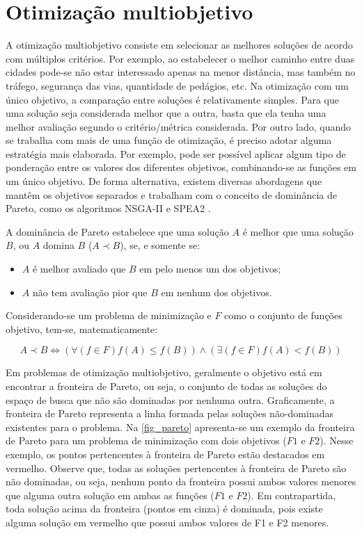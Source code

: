 \chapter[Otimização multiobjetivo]{Otimização multiobjetivo}

A otimização multiobjetivo consiste em selecionar as melhores soluções de acordo com múltiplos critérios. Por exemplo, ao estabelecer o melhor caminho entre duas cidades pode-se não estar interessado apenas na menor distância, mas também no tráfego, segurança das vias, quantidade de pedágios, etc. Na otimização com um único objetivo, a comparação entre soluções é relativamente simples. Para que uma solução seja considerada melhor que a outra, basta que ela tenha uma melhor avaliação segundo o critério/métrica considerada. Por outro lado, quando se trabalha com mais de uma função de otimização, é preciso adotar alguma estratégia mais elaborada. Por exemplo, pode ser possível aplicar algum tipo de ponderação entre os valores dos diferentes objetivos, combinando-se as funções em um único objetivo. De forma alternativa, existem diversas abordagens que mantêm os objetivos separados e trabalham com o conceito de dominância de Pareto, como os algoritmos NSGA-II \cite{Deb2002} e SPEA2 \cite{Zitzler2002}.

A dominância de Pareto estabelece que uma solução $A$ é melhor que uma solução $B$, ou $A$ domina $B$ ($A \prec B$), se, e somente se:

\begin{itemize}  
	\item $A$ é melhor avaliado que $B$ em pelo menos um dos objetivos;
	\item $A$ não tem avaliação pior que $B$ em nenhum dos objetivos.
\end{itemize}

Considerando-se um problema de minimização e $F$ como o conjunto de funções objetivo, tem-se, matematicamente:

\begin{equation}A \prec B \Leftrightarrow (\forall(f \in F) f(A) \leq f(B)) \land (\exists (f \in F) f(A) < f(B))\end{equation}

Em problemas de otimização multiobjetivo, geralmente o objetivo está em encontrar a fronteira de Pareto, ou seja, o conjunto de todas as soluções do espaço de busca que não são dominadas por nenhuma outra. Graficamente, a fronteira de Pareto representa a linha formada pelas soluções não-dominadas existentes para o problema. Na \autoref{fig_pareto} apresenta-se um exemplo da fronteira de Pareto para um problema de minimização com dois objetivos ($F1$ e $F2$). Nesse exemplo, os pontos pertencentes à fronteira de Pareto estão destacados em vermelho. Observe que, todas as soluções pertencentes à fronteira de Pareto são não dominadas, ou seja, nenhum ponto da fronteira possui ambos valores menores que alguma outra solução em ambas as funções ($F1$ e $F2$). Em contrapartida, toda solução acima da fronteira (pontos em cinza) é dominada, pois existe alguma solução em vermelho que possui ambos valores de F1 e F2 menores.

